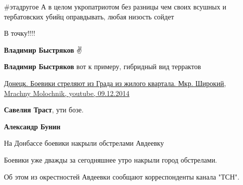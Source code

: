 \begin{itemize}
\#этадругое
А в целом укропатриотом без разницы чем своих всушных и тербатовских убийц оправдывать, любая низость сойдет

 

В точку!!!!


\begin{itemize}
 
\textbf{Владимир Быстряков} ✌

 
\textbf{Владимир Быстряков} вот к примеру, гибридный вид террактов

\href{https://youtu.be/N1zbZZii5rs}{%
Донецк. Боевики стреляют из Града из жилого квартала. Мкр. Широкий, %
Mrachny Molochnik, %
youtube, 09.12.2014%
}

 
\textbf{Савелия Траст}, ути бозе.

 
\textbf{Александр Бунин}

На Донбассе боевики накрыли обстрелами Авдеевку

Боевики уже дважды за сегодняшнее утро накрыли город обстрелами.

Об этом из окрестностей Авдеевки сообщают корреспонденты канала "ТСН".


\end{itemize}
\end{itemize}
